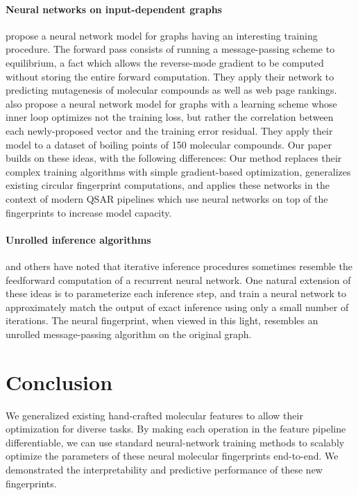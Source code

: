 \documentclass{article}
\newcommand{\citet}{\cite}
\begin{document}
\paragraph{Neural networks on input-dependent graphs}
\cite{graphnn2009} propose a neural network model for graphs having an interesting training procedure.
The forward pass consists of running a message-passing scheme to equilibrium, a fact which allows the reverse-mode gradient to be computed without storing the entire forward computation.
They apply their network to predicting mutagenesis of molecular compounds as well as web page rankings.
\cite{micheli2009neural} also propose a neural network model for graphs with a learning scheme whose inner loop optimizes not the training loss, but rather the correlation between each newly-proposed vector and the training error residual.
They apply their model to a dataset of boiling points of 150 molecular compounds.
Our paper builds on these ideas, with the following differences:
Our method replaces their complex training algorithms with simple gradient-based optimization, generalizes existing circular fingerprint computations, and applies these networks in the context of modern QSAR pipelines which use neural networks on top of the fingerprints to increase model capacity.

\paragraph{Unrolled inference algorithms}
\citet{hershey2014deep} and others have noted that iterative inference procedures sometimes resemble the feedforward computation of a recurrent neural network.
One natural extension of these ideas is to parameterize each inference step, and train a neural network to approximately match the output of exact inference using only a small number of iterations.
The neural fingerprint, when viewed in this light, resembles an unrolled message-passing algorithm on the original graph.


\section{Conclusion}
We generalized existing hand-crafted molecular features to allow their optimization for diverse tasks.
By making each operation in the feature pipeline differentiable, we can use standard neural-network training methods to scalably optimize the parameters of these neural molecular fingerprints end-to-end.
We demonstrated the interpretability and predictive performance of these new fingerprints.
\end{document}
